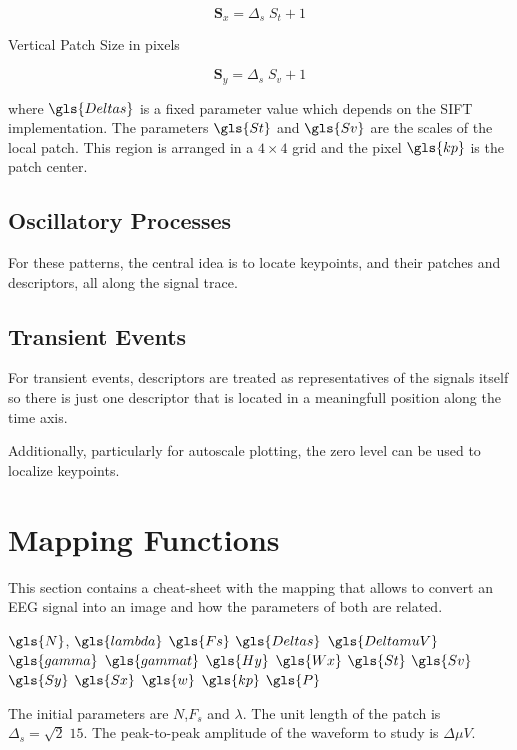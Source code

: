 \begin{equation}
\mathbf{S}_x = \Delta_s \; S_t + 1
\label{eq:sx}
\end{equation}

Vertical Patch Size in pixels

\begin{equation}
\mathbf{S}_y = \Delta_s \; S_v + 1
\label{eq:sy}
\end{equation}


\noindent where $\gls{Deltas}$ is a fixed parameter value which depends on the SIFT implementation. The parameters $\gls{St}$  and $\gls{Sv}$ are the scales of the local patch. This region is arranged in a $4 \times 4$ grid and the pixel $\gls{kp}$ is the patch center. 


\subsection{Oscillatory Processes}

For these patterns, the central idea is to locate keypoints, and their patches and descriptors, all along the signal trace. 

\subsection{Transient Events}

For transient events, descriptors are treated as representatives of the signals itself so there is just one descriptor that is located in a meaningfull position along the time axis.

Additionally, particularly for autoscale plotting, the zero level can be used to localize keypoints.

\section{Mapping Functions}

This section contains a cheat-sheet with the mapping that allows to convert an EEG signal into an image and how the parameters of both are related.

$\gls{N}$, 
$\gls{lambda}$
$\gls{Fs}$
$\gls{Deltas}$
$\gls{DeltamuV}$
$\gls{gamma}$
$\gls{gammat}$
$\gls{Hy}$
$\gls{Wx}$
$\gls{St}$
$\gls{Sv}$
$\gls{Sy}$
$\gls{Sx}$
$\gls{w}$
$\gls{kp}$
$\gls{P}$

The initial parameters are $N$,$F_s$ and $\lambda$.  The unit length of the patch is $\Delta_s = \sqrt{2} \; 15$.  The peak-to-peak amplitude of the waveform to study is $ \Delta \mu V $.

